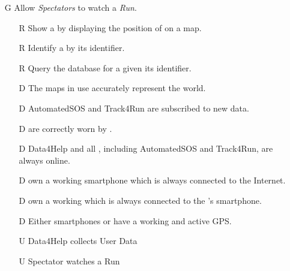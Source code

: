 \documentclass[../../../rasd.tex]{subfiles}
\begin{document}
\begin{itemize}
    \item[G\subs{10}]Allow \textit{Spectators} to watch a \textit{Run}.
    \begin{itemize}
        \item[R\subs{46}]Show a  by displaying the position of  on a map.
        \item[R\subs{47}]Identify a  by its identifier.
        \item[R\subs{48}]Query the database for a  given its identifier.
        \\
        \item[D\subs{3}]The maps in use accurately represent the world.
        \item[D\subs{6}]AutomatedSOS and Track4Run are subscribed to new data.
        \item[D\subs{8}] are correctly worn by .
        \item[D\subs{9}]Data4Help and all , including AutomatedSOS and Track4Run, are always online.
        \item[D\subs{10}] own a working smartphone which is always connected to the Internet.
        \item[D\subs{11}] own a working  which is always connected to the 's smartphone.
        \item[D\subs{12}]Either smartphones or  have a working and active GPS.
        \\
        \item[U\subs{5}]Data4Help collects User Data
        \item[U\subs{16}]Spectator watches a Run
    \end{itemize}
\end{itemize}
\end{document}

